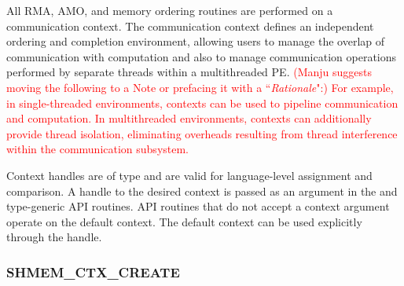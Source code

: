 \color{ForestGreen}

All \openshmem RMA, AMO, and memory ordering routines are
performed on a communication context.  The communication context defines an
independent ordering and completion environment, allowing users to manage the
overlap of communication with computation and also to manage communication
operations performed by separate threads within a multithreaded \ac{PE}.
\textcolor{red}{(Manju suggests moving the following to a Note or prefacing it with a
``\textit{Rationale}":) For example, in single-threaded environments, contexts can
be used to pipeline communication and computation.  In multithreaded
environments, contexts can additionally provide thread isolation, eliminating
overheads resulting from thread interference within the communication
subsystem.}

Context handles are of type  and are valid for
language-level assignment and comparison.  A handle to the desired context is
passed as an argument in the \Cstd {} and type-generic API
routines.  API routines that do not accept a context argument operate on the
default context.  The default context can be used explicitly through the
 handle.

\subsubsection{\textbf{SHMEM\_CTX\_CREATE}}
\label{subsec:shmem_ctx_create}

